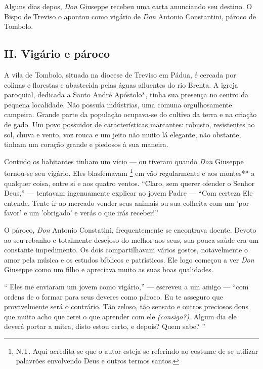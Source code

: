 \documentclass[12pt,a4paper,oneside]{book}
\begin{document}
\quad Alguns dias depos, \emph{Don} Giuseppe recebeu uma carta anunciando seu destino. O Bispo de Treviso o apontou como vigário de \emph{Don} Antonio Constantini, pároco de Tombolo.


\pagebreak

\begin{center}
    {\section*{II. Vigário e pároco}}

\end{center}


\quad  A vila de Tombolo, situada na diocese de Treviso em Pádua, é cercada por colinas e florestas e abastecida pelas águas afluentes do rio Brenta. A igreja paroquial, dedicada a Santo André Apóstolo*, tinha sua presença no centro da pequena localidade. Não possuía indústrias, uma comuna orgulhosamente campeira. Grande parte da população ocupava-se do cultivo da terra e na criação de gado. Um povo possuidor de características marcantes: robusto, resistentes ao sol, chuva e vento, voz rouca e um jeito não muito lá elegante, não obstante, tinham um coração grande e piedosos à sua maneira.

\quad Contudo os habitantes tinham um vício --- ou tiveram quando \emph{Don} Giuseppe tornou-se seu vigário. Eles blasfemavam \footnote[3]{N.T. Aqui acredita-se que o autor esteja se referindo ao costume de se utilizar palavrões envolvendo Deus e outros termos santos.} em vão regularmente e aos montes** a qualquer coisa, entre si e aos quatro ventos. ``Claro, sem querer ofender o Senhor Deus,'' --- tentavam ingenuamente explicar ao jovem Padre --- ``Com certeza Ele entende. Tente ir ao mercado vender seus animais ou sua colheita com um 'por favor' e um 'obrigado' e verás o que irás receber!''

\quad O pároco, \emph{Don} Antonio Constatini, frequentemente se encontrava doente. Devoto ao seu rebanho e totalmente desejoso do melhor aos seus, sua pouca saúde era um constante impedimento. Os dois compartilhavam vários gostos, notavelmente o amor pela música e os estudos bíblicos e patrísticos. Ele logo começou a ver \emph{Don} Giuseppe como um filho e apreciava muito as suas boas qualidades.

\quad `` Eles me enviaram um jovem como vigário,'' --- escreveu a um amigo --- ``com ordens de o formar para seus deveres como pároco. Eu te asseguro que provavelmente será o contrário. Tão zeloso, tão sensato e outros preciosos dons que muito acho que terei o que aprender com ele \emph{(consigo?)}. Algum dia ele deverá portar a mitra, disto estou certo, e depois? Quem sabe?  ''
\end{document}
